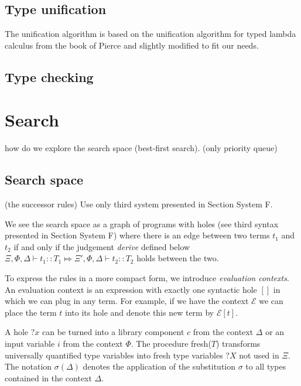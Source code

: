  
 
  \subsection{Type unification}
The unification algorithm is based on the unification algorithm for typed lambda calculus from the book of Pierce  and slightly modified to fit our needs.
  
  
  \subsection{Type checking}
  

\section{Search}
how do we explore the search space (best-first search).
 (only priority queue)
\subsection{Search space}\label{Search space} (the successor rules)
Use only third system presented in Section System F.

We see the search space as a graph of programs with holes (see third syntax presented in Section System F) where there is an edge between two terms $t_1$ and $t_2$ if and only if the judgement \emph{derive} defined below $\Xi, \Phi, \Delta \vdash t_1 :: T_1 \Mapsto \Xi', \Phi, \Delta \vdash t_2 :: T_2$ holds between the two.

To express the rules in a more compact form, we introduce \emph{evaluation contexts}. An evaluation context is an expression with exactly one syntactic hole $[]$ in which we can plug in any term. For example, if we have the context $\mathcal{E}$ we can place the term $t$ into its hole and denote this new term by $\mathcal{E}[t]$.

A hole $?x$ can be turned into a library component $c$ from the context $\Delta$ or an input variable $i$ from the context $\Phi$. The procedure fresh($T$) transforms universally quantified type variables into fresh type variables $?X$ not used in $\Xi$.
The notation $\sigma(\Delta)$ denotes the application of the substitution $\sigma$ to all types contained in the context $\Delta$.

\begin{prooftree}
\end{prooftree}

